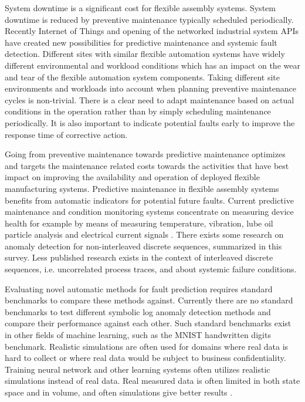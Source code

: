 \documentclass[journal]{IEEEtran}
\begin{document}
System downtime is a significant cost for flexible assembly systems. System downtime is reduced by preventive maintenance typically scheduled periodically.
Recently Internet of Things and opening of the networked industrial system APIs have created new possibilities for predictive maintenance and systemic fault detection. Different sites with similar
flexible automation systems have widely different environmental and workload conditions which has an impact on the wear and tear of the flexible automation system components.
Taking different site environments and workloads into account when planning preventive maintenance cycles is non-trivial. There is a clear need to adapt maintenance based on actual
conditions in the operation rather than by simply scheduling maintenance periodically\cite{hashemian2011state}.
It is also important to indicate potential faults early to improve the response time of corrective action.

Going from preventive maintenance towards predictive maintenance optimizes and targets the maintenance related costs towards the activities that have best impact
on improving the availability and operation of deployed flexible manufacturing systems.
Predictive maintenance in flexible assembly systems benefits from automatic indicators for potential future faults.
Current predictive maintenance and condition monitoring systems concentrate on measuring device health for example by means of measuring temperature\cite{mobley2002introduction},
vibration\cite{scheffer2004practical}, lube oil particle analysis\cite{hunt1993handbook} and electrical current signals
\cite{thomson2001current}. There exists some research on anomaly detection for non-interleaved discrete sequences, summarized in this survey\cite{chandola2012anomaly}.
Less published research exists in the context of interleaved discrete sequences, i.e. uncorrelated process traces, and about systemic failure conditions.

Evaluating novel automatic methods for fault prediction requires standard benchmarks to compare these methods against. Currently there are no standard benchmarks to test
different symbolic log anomaly detection methods and compare their performance against each other. Such standard benchmarks exist in other fields of machine learning,
such as the MNIST handwritten digits benchmark\cite{lecun-mnisthandwrittendigit-2010}. Realistic simulations are often used\cite{jager2014assessing} for domains where
real data is hard to collect or where real data would be subject to business confidentiality. Training neural network and other learning systems often utilizes realistic
simulations instead of real data. Real measured data is often limited in both state space and in volume, and often simulations give better results \cite{duch2005artificial}.
\end{document}
